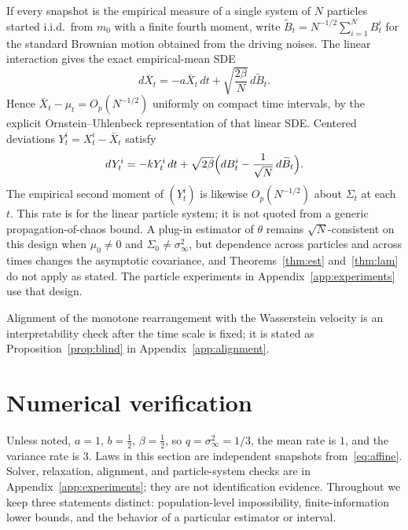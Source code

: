 \documentclass[anon,11pt]{alt2027}
\begin{document}
\begin{remark}
\label{rem:particles}
If every snapshot is the empirical measure of a single system of $N$ particles
started i.i.d.\ from $m_0$ with a finite fourth moment, write
$\widetilde B_t=N^{-1/2}\sum_{i=1}^N B^i_t$ for the standard Brownian motion
obtained from the driving noises. The linear interaction gives the exact
empirical-mean SDE
\[
d\bar X_t=-a\bar X_t\,dt+\sqrt{\frac{2\beta}{N}}\,d\widetilde B_t.
\]
Hence $\bar X_t-\mu_t=O_p(N^{-1/2})$ uniformly on compact time intervals, by
the explicit Ornstein--Uhlenbeck representation of that linear SDE. Centered
deviations $Y^i_t=X^i_t-\bar X_t$ satisfy
\[
dY^i_t=-k Y^i_t\,dt+\sqrt{2\beta}\Bigl(dB^i_t-\frac1{\sqrt N}\,d\widetilde B_t\Bigr).
\]
The empirical second moment of $(Y^i_t)$ is likewise $O_p(N^{-1/2})$ about
$\Sigma_t$ at each $t$. This rate is for the linear particle system; it is not
quoted from a generic propagation-of-chaos bound. A plug-in estimator of
$\theta$ remains $\sqrt N$-consistent on this design when $\mu_0\neq 0$ and
$\Sigma_0\neq\sigma_\infty^2$, but dependence across particles and across times
changes the asymptotic covariance, and Theorems~\ref{thm:est}
and~\ref{thm:lam} do not apply as stated. The particle experiments in
Appendix~\ref{app:experiments} use that design.
\end{remark}

Alignment of the monotone rearrangement with the Wasserstein velocity is an
interpretability check after the time scale is fixed; it is stated as
Proposition~\ref{prop:blind} in Appendix~\ref{app:alignment}.

\section{Numerical verification}
\label{sec:numerics}

Unless noted, $a=1$, $b=\tfrac12$, $\beta=\tfrac12$, so $q=\sigma_\infty^2=1/3$,
the mean rate is $1$, and the variance rate is $3$. Laws in this section are
independent snapshots from~\eqref{eq:affine}. Solver, relaxation, alignment,
and particle-system checks are in Appendix~\ref{app:experiments}; they are
not identification evidence. Throughout we keep three statements distinct:
population-level impossibility, finite-information lower bounds, and the
behavior of a particular estimator or interval.
\end{document}

